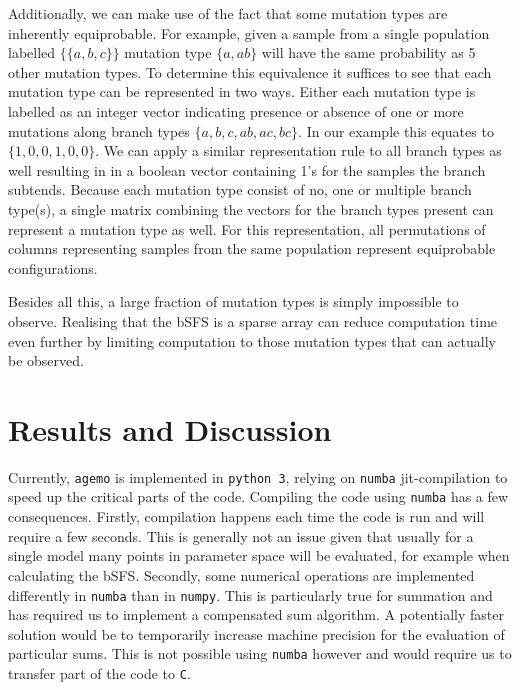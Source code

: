 \documentclass[10pt, a4]{article}
\begin{document}
Additionally, we can make use of the fact that some mutation types are inherently equiprobable. For example, given a sample from a single population labelled $\{\{a, b, c\}\}$ mutation type $\{a, ab\}$ will have the same probability as 5 other mutation types. To determine this equivalence it suffices to see that each mutation type can be represented in two ways. Either each mutation type is labelled as an integer vector indicating presence or absence of one or more mutations along branch types $\{a, b, c, ab, ac, bc\}$. In our example this equates to $\{1, 0, 0,1, 0, 0\}$. We can apply a similar representation rule to all branch types as well resulting in in a boolean vector containing 1's for the samples the branch subtends. Because each mutation type consist of no, one or multiple branch type(s), a single matrix combining the vectors for the branch types present can represent a mutation type as well. For this representation, all permutations of columns representing samples from the same population represent equiprobable configurations.

Besides all this, a large fraction of mutation types is simply impossible to observe. Realising that the bSFS is a sparse array can reduce computation time even further by limiting computation to those mutation types that can actually be observed.

\section{Results and Discussion}


%


Currently, \texttt{agemo} is implemented in \texttt{python 3}, relying on \texttt{numba} jit-compilation to speed up the critical parts of the code. Compiling the code using \texttt{numba} has a few consequences. Firstly, compilation happens each time the code is run and will require a few seconds. This is generally not an issue given that usually for a single model many points in parameter space will be evaluated, for example when calculating the bSFS. Secondly, some numerical operations are implemented differently in \texttt{numba} than in \texttt{numpy}. This is particularly true for summation and has required us to implement a compensated sum algorithm.  A potentially faster solution would be to temporarily increase machine precision for the evaluation of particular sums. This is not possible using \texttt{numba} however and would require us to transfer part of the code to \texttt{C}.
\end{document}
